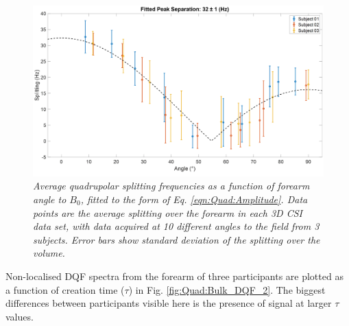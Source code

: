 \begin{figure}
    \centering
    \includegraphics[width=1\textwidth]{Figures/Quad/Split_Angle_2.png}
    \caption{\textit{Average quadrupolar splitting frequencies as a function of forearm angle to $B_0$, fitted to the form of Eq. \ref{eqn:Quad:Amplitude}. Data points are the average splitting over the forearm in each 3D \ac{CSI} data set, with data acquired at 10 different angles to the field from 3 subjects. Error bars show standard deviation of the splitting over the volume.}}
    \label{fig:Quad:Split_Angle_2}
\end{figure}

Non-localised \ac{DQF} spectra from the forearm of three participants are plotted as a function of creation time ($\tau$) in Fig. \ref{fig:Quad:Bulk_DQF_2}. The biggest differences between participants visible here is the presence of signal at larger $\tau$ values.

